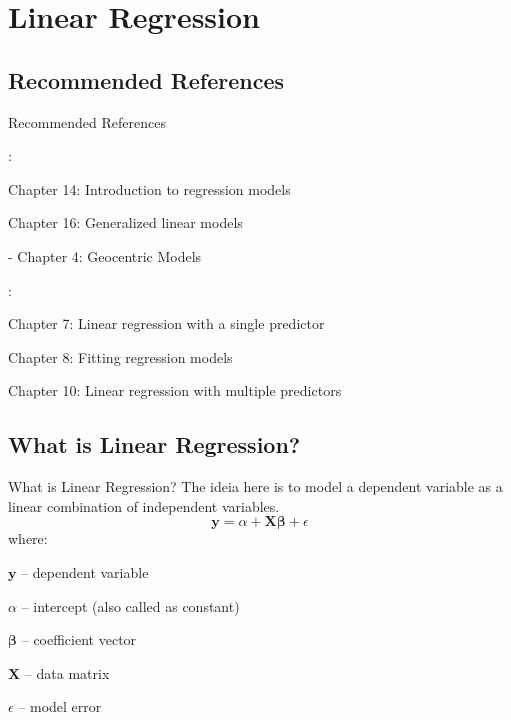 \section{Linear Regression}

\subsection{Recommended References}
\begin{frame}{Recommended References}
	\begin{vfilleditems}
		\item \textcite{gelman2013bayesian}:
		\begin{vfilleditems}
			\item Chapter 14: Introduction to regression models
			\item Chapter 16: Generalized linear models
		\end{vfilleditems}
		\item \textcite{mcelreath2020statistical} - Chapter 4: Geocentric Models
		\item \textcite{gelman2020regression}:
		\begin{vfilleditems}
			\item Chapter 7: Linear regression with a single predictor
			\item Chapter 8: Fitting regression models
			\item Chapter 10: Linear regression with multiple predictors
		\end{vfilleditems}
	\end{vfilleditems}
\end{frame}

\subsection{What is Linear Regression?}
\begin{frame}{What is Linear Regression?}
	The ideia here is to model a dependent variable as a linear combination
	of independent variables.
	$$
		\mathbf{y} = \alpha +  \mathbf{X} \boldsymbol{\beta} + \epsilon
	$$
	where:
	\begin{vfilleditems}
		\item $\mathbf{y}$ -- dependent variable
		\item $\alpha$ -- intercept (also called as constant)
		\item $\boldsymbol{\beta}$ -- coefficient vector
		\item $\mathbf{X}$ -- data matrix
		\item $\epsilon$ -- model error
	\end{vfilleditems}
\end{frame}


